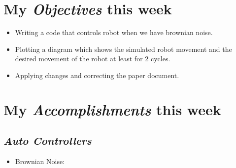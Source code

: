 \newcommand{\handoutName}{Weekly report}
\newcommand{\handoutdate}{November 10, 2014}
\newcommand{\duedate}{}


\section{My \emph{Objectives} this week}
\begin{itemize}
\item Writing a code that controls robot when we have brownian noise.
\item Plotting a diagram which shows the simulated robot movement and the desired movement of the robot at least for 2 cycles.
\item Applying changes and correcting the paper document.
\end{itemize}


\section{My \emph{Accomplishments} this week}

\subsection{\emph{Auto Controllers}}

\begin{itemize}
\item Brownian Noise:
\end{itemize}


